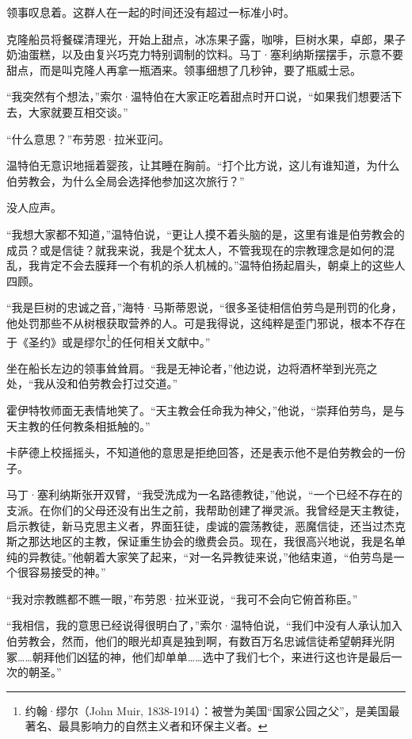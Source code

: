 \documentclass[AutoFakeBold=true]{book}
\begin{document}
领事叹息着。这群人在一起的时间还没有超过一标准小时。

克隆船员将餐碟清理光，开始上甜点，冰冻果子露，咖啡，巨树水果，卓郎，果子奶油蛋糕，以及由复兴巧克力特别调制的饮料。马丁·塞利纳斯摆摆手，示意不要甜点，而是叫克隆人再拿一瓶酒来。领事细想了几秒钟，要了瓶威士忌。

\vspace*{1em}

``我突然有个想法，''索尔·温特伯在大家正吃着甜点时开口说，``如果我们想要活下去，大家就要互相交谈。''

``什么意思？''布劳恩·拉米亚问。

温特伯无意识地摇着婴孩，让其睡在胸前。``打个比方说，这儿有谁知道，为什么伯劳教会，为什么全局会选择他参加这次旅行？''

没人应声。

``我想大家都不知道，''温特伯说，``更让人摸不着头脑的是，这里有谁是伯劳教会的成员？或是信徒？就我来说，我是个犹太人，不管我现在的宗教理念是如何的混乱，我肯定不会去膜拜一个有机的杀人机械的。''温特伯扬起眉头，朝桌上的这些人四顾。

``我是巨树的忠诚之音，''海特·马斯蒂恩说，``很多圣徒相信伯劳鸟是刑罚的化身，他处罚那些不从树根获取营养的人。可是我得说，这纯粹是歪门邪说，根本不存在于《圣约》或是缪尔\footnote{约翰·缪尔（John Muir, 1838-1914）：被誉为美国``国家公园之父''，是美国最著名、最具影响力的自然主义者和环保主义者。}的任何相关文献中。''

坐在船长左边的领事耸耸肩。``我是无神论者，''他边说，边将酒杯举到光亮之处，``我从没和伯劳教会打过交道。''

霍伊特牧师面无表情地笑了。``天主教会任命我为神父，''他说，``崇拜伯劳鸟，是与天主教的任何教条相抵触的。''

卡萨德上校摇摇头，不知道他的意思是拒绝回答，还是表示他不是伯劳教会的一份子。

马丁·塞利纳斯张开双臂，``我受洗成为一名路德教徒，''他说，``一个已经不存在的支派。在你们的父母还没有出生之前，我帮助创建了禅灵派。我曾经是天主教徒，启示教徒，新马克思主义者，界面狂徒，虔诚的震荡教徒，恶魔信徒，还当过杰克斯之那达地区的主教，保证重生协会的缴费会员。现在，我很高兴地说，我是名单纯的异教徒。''他朝着大家笑了起来，``对一名异教徒来说，''他结束道，``伯劳鸟是一个很容易接受的神。''

``我对宗教瞧都不瞧一眼，''布劳恩·拉米亚说，``我可不会向它俯首称臣。''

``我相信，我的意思已经说得很明白了，''索尔·温特伯说，``我们中没有人承认加入伯劳教会，然而，他们的眼光却真是独到啊，有数百万名忠诚信徒希望朝拜光阴冢……朝拜他们凶猛的神，他们却单单……选中了我们七个，来进行这也许是最后一次的朝圣。''
\end{document}
